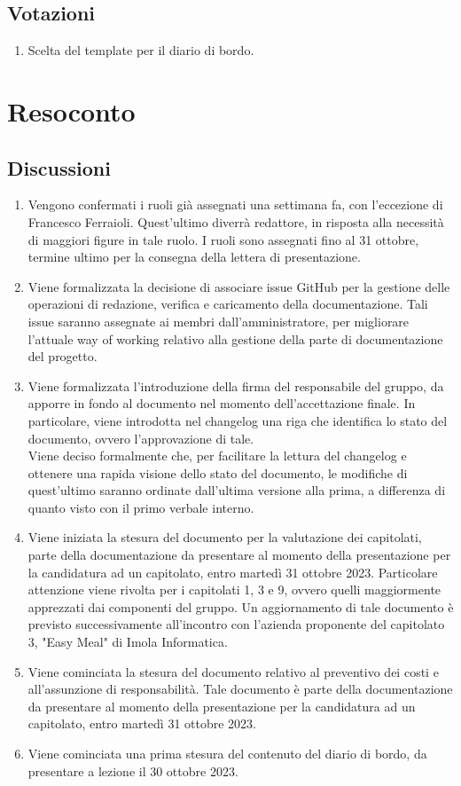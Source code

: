 \documentclass[12pt]{article}
\begin{document}
\subsection{Votazioni} \label{subsec:votazione}
\begin{enumerate}
    \item Scelta del template per il diario di bordo.
\end{enumerate}
\section{Resoconto} \label{sec:resoconto}
\subsection{Discussioni} \label{subsec:resdiscussione}
\begin{enumerate}
    \item Vengono confermati i ruoli già assegnati una settimana fa, con l'eccezione di Francesco Ferraioli. Quest'ultimo diverrà redattore, in risposta alla necessità di maggiori figure in tale ruolo. I ruoli sono assegnati fino al 31 ottobre, termine ultimo per la consegna della lettera di presentazione.
    \item Viene formalizzata la decisione di associare issue GitHub per la gestione delle operazioni di redazione, verifica e caricamento della documentazione. Tali issue saranno assegnate ai membri dall'amministratore, per migliorare l'attuale way of working relativo alla gestione della parte di documentazione del progetto.
    \item Viene formalizzata l'introduzione della firma del responsabile del gruppo, da apporre in fondo al documento nel momento dell'accettazione finale. In particolare, viene introdotta nel changelog una riga che identifica lo stato del documento, ovvero l'approvazione di tale.\\
    Viene deciso formalmente che, per facilitare la lettura del changelog e ottenere una rapida visione dello stato del documento, le modifiche di quest'ultimo saranno ordinate dall'ultima versione alla prima, a differenza di quanto visto con il primo verbale interno.
    \item Viene iniziata la stesura del documento per la valutazione dei capitolati, parte della documentazione da presentare al momento della presentazione per la candidatura ad un capitolato, entro martedì 31 ottobre 2023. Particolare attenzione viene rivolta per i capitolati 1, 3 e 9, ovvero quelli maggiormente apprezzati dai componenti del gruppo. Un aggiornamento di tale documento è previsto successivamente all'incontro con l'azienda proponente del capitolato 3, "Easy Meal" di Imola Informatica.
    \item Viene cominciata la stesura del documento relativo al preventivo dei costi e all'assunzione di responsabilità. Tale documento è parte della documentazione da presentare al momento della presentazione per la candidatura ad un capitolato, entro martedì 31 ottobre 2023.
    \item Viene cominciata una prima stesura del contenuto del diario di bordo, da presentare a lezione il 30 ottobre 2023.
    

\end{enumerate}
\end{document}
